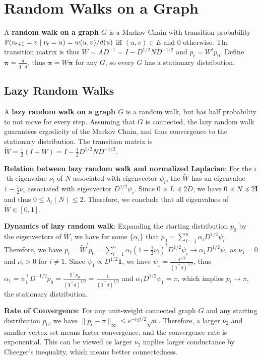 \section{Random Walks on a Graph}

A \textbf{random walk on a graph $G$} is a Markov Chain with transition probability $\mathbb{P}(v_{t+1}=v \mid v_t=u)= w(u,v)/d(u)$ iff $(u,v)\in E$ and 0 otherwise. The transition matrix is thus $W=AD^{-1} = I - D^{1/2} N D^{-1/2}$ and $p_t = W^t p_0$. Define $\boldsymbol{\pi}=\frac{d}{\boldsymbol{1}^\top d}$, thus $\boldsymbol{\pi} = W \boldsymbol{\pi}$ for any $G$, so every $G$ has a stationary distribution.

\subsection{Lazy Random Walks}

A \textbf{lazy random walk on a graph $G$} is a random walk, but has half probability to not move for every step. Assuming that $G$ is connected, the lazy random walk guarantees ergodicity of the Markov Chain, and thus convergence to the stationary distribution. The transition matrix is $\tilde{W} = \frac{1}{2}(I+W) = I - \frac{1}{2} D^{1/2} N D^{-1/2}$.

\textbf{Relation between lazy random walk and normalized Laplacian}: For the $i$-th eigenvalue $\nu_i$ of $N$ associated with eigenvector $\psi_i$, the $\tilde{W}$ has an eigenvalue $1-\frac{1}{2}\nu_i$ associated with eigenvector $D^{1/2}\psi_i$. Since $0 \preceq L \preceq 2D$, we have $0 \preceq N \preceq 2\boldsymbol{I}$ and thus $0\le \lambda_i(N) \le 2$. Therefore, we conclude that all eigenvalues of $\tilde{W} \in [0,1]$.

\textbf{Dynamics of lazy random walk}: Expanding the starting distribution $p_0$ by the eigenvectors of $\tilde{W}$, we have for some $\{\alpha_i\}$ that $p_0 = \sum_{i=1}^n \alpha_i D^{1/2} \psi_i$. Therefore, we have $p_t = \tilde{W}^t p_0 = \sum_{i=1}^n \alpha_i (1-\frac{1}{2}\nu_i)^t D^{1/2}\psi_i \rightarrow \alpha_1 D^{1/2}\psi_1$ as $\nu_1=0$ and $\nu_i>0$ for $i\ne 1$. Since $\psi_1 \propto D^{1/2}\boldsymbol{1}$, we have $\psi_1 = \frac{d^{1/2}}{(\boldsymbol{1}^\top d)^{1/2}}$, thus $\alpha_1 = \psi_1^\top D^{-1/2} p_0 = \frac{\boldsymbol{1}^\top p_0}{(\boldsymbol{1}^\top d)^{1/2}} = \frac{1}{(\boldsymbol{1}^\top d)^{1/2}}$ and $\alpha_1 D^{1/2} \psi_1 = \pi$, which implies $p_t \rightarrow \pi$, the stationary distribution.

\textbf{Rate of Convergence}: For any unit-weight connected graph $G$ and any starting distribution $p_0$, we have $\|p_t - \pi\|_\infty \le e^{-\nu_2 t/2} \sqrt{n}$. Therefore, a larger $\nu_2$ and smaller vertex set means faster convergence, and the convergence rate is exponential. This can be viewed as larger $\nu_2$ implies larger conductance by Cheeger's inequality, which means better connectedness.

